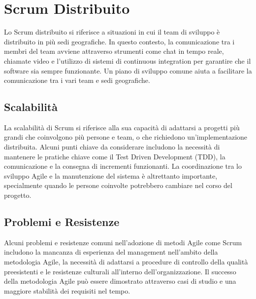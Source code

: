 \section{Scrum Distribuito}
Lo Scrum distribuito si riferisce a situazioni in cui il team di sviluppo è distribuito in più sedi geografiche. In questo contesto,
la comunicazione tra i membri del team avviene attraverso strumenti come chat in tempo reale, chiamate video e l'utilizzo di sistemi
di continuous integration per garantire che il software sia sempre funzionante. Un piano di sviluppo comune aiuta a facilitare la
comunicazione tra i vari team e sedi geografiche.

\subsection{Scalabilità}
La scalabilità di Scrum si riferisce alla sua capacità di adattarsi a progetti più grandi che coinvolgono più persone e team,
o che richiedono un'implementazione distribuita. Alcuni punti chiave da considerare includono la necessità di mantenere le pratiche
chiave come il Test Driven Development (TDD), la comunicazione e la consegna di incrementi funzionanti. La coordinazione tra lo
sviluppo Agile e la manutenzione del sistema è altrettanto importante, specialmente quando le persone coinvolte potrebbero cambiare
nel corso del progetto.

\subsection{Problemi e Resistenze}
Alcuni problemi e resistenze comuni nell'adozione di metodi Agile come Scrum includono la mancanza di esperienza del management nell'ambito
della metodologia Agile, la necessità di adattarsi a procedure di controllo della qualità preesistenti e le resistenze culturali all'interno
dell'organizzazione. Il successo della metodologia Agile può essere dimostrato attraverso casi di studio e una maggiore stabilità dei requisiti
nel tempo.
